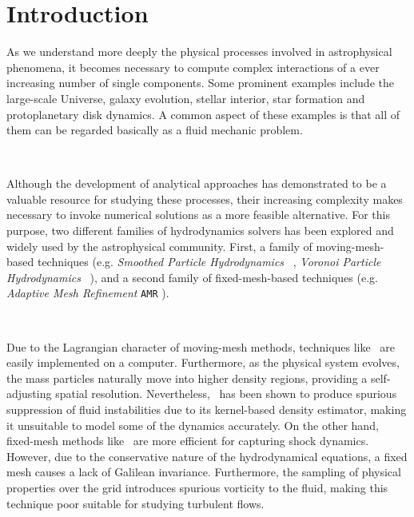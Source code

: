 \documentclass[a4,useAMS,usenatbib,usegraphicx,12pt]{article}
\begin{document}
\newpage


\section{Introduction}
As we understand more deeply the physical processes involved in astrophysical 
phenomena, it becomes necessary to compute complex interactions of a ever 
increasing number of single components. Some prominent examples include 
the large-scale Universe, galaxy evolution, stellar interior, star formation 
and protoplanetary disk dynamics. A common aspect of these examples is that all 
of them can be regarded basically as a fluid mechanic problem.

\

Although the development of analytical approaches has demonstrated to be a
valuable resource for studying these processes, their increasing complexity 
makes necessary to invoke numerical solutions as a more feasible alternative. 
For this purpose, two different families of hydrodynamics solvers has been 
explored and widely used by the astrophysical community. First, a family of 
moving-mesh-based techniques (e.g. \textit{Smoothed Particle Hydrodynamics} 
\SPH\ \citep{Lucy77,Gingold77}, \textit{Voronoi Particle Hydrodynamics} \VPH\ 
\citep{Hess10}), and a second family of fixed-mesh-based techniques (e.g.
\textit{Adaptive Mesh Refinement} \texttt{AMR} \citep{Berger89}).

\

Due to the Lagrangian character of moving-mesh methods, techniques like \SPH\ 
are easily implemented on a computer. Furthermore, as the physical system 
evolves, the mass particles naturally move into higher density regions, 
providing a self-adjusting spatial resolution. Nevertheless, \SPH\ has been 
shown to produce spurious suppression of fluid instabilities due to its 
kernel-based density estimator, making it unsuitable to model some of the 
dynamics accurately. On the other hand, fixed-mesh methods like \AMR\ are more 
efficient for capturing shock dynamics. However, due to the conservative nature 
of the hydrodynamical equations, a fixed mesh causes a lack of Galilean 
invariance. Furthermore, the sampling of physical properties over the grid 
introduces spurious vorticity to the fluid, making this technique poor suitable 
for studying turbulent flows.
\end{document}
